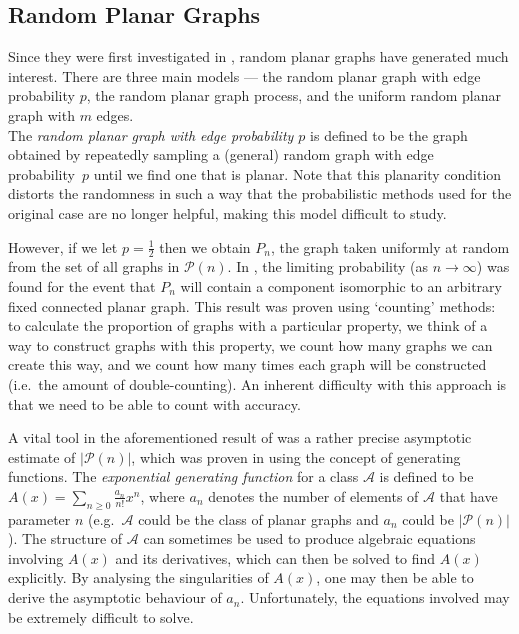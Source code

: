 \documentclass{article}
\newtheorem{Proof of Theorem}{Proof of Theorem}
\begin{document}
\subsection*{Random Planar Graphs}

Since they were first investigated in \cite{den},
random planar graphs have generated much interest.
There are three main models --- 
the random planar graph with edge probability $p$,
the random planar graph process,
and the uniform random planar graph with $m$ edges. \\

The \textit{random planar graph with edge probability $p$} is defined to be the graph obtained by 
repeatedly sampling a (general) random graph with edge probability~$p$ until we find one that is planar.
Note that this planarity condition distorts the randomness in such a way that the probabilistic methods 
used for the original case are no longer helpful,
making this model difficult to study.

However, if we let $p=\frac{1}{2}$ then we obtain $P_{n}$,
the graph taken uniformly at random from the set of all graphs in $\mathcal{P}(n)$.
In \cite{mcd}, the limiting probability (as $n \to \infty$) was found for the event that
$P_{n}$ will contain a component isomorphic to an arbitrary fixed connected planar graph.
This result was proven using `counting' methods:
to calculate the proportion of graphs with a particular property,
we think of a way to construct graphs with this property,
we count how many graphs we can create this way,
and we count how many times each graph will be constructed (i.e.~the amount of double-counting).
An inherent difficulty with this approach is that we need to be able to count with accuracy.

A vital tool in the aforementioned result of \cite{mcd} was a rather precise asymptotic estimate of $|\mathcal{P}(n)|$,
which was proven in \cite{gim} using the concept of generating functions.
The \textit{exponential generating function} for a class $\mathcal{A}$
is defined to be $A(x) = \sum_{n \geq 0} \frac{a_{n}}{n!} x^{n}$,
where $a_{n}$ denotes the number of elements of $\mathcal{A}$ that have parameter $n$
(e.g.~$\mathcal{A}$ could be the class of planar graphs and $a_{n}$ could be $|\mathcal{P}(n)|$).
The structure of $\mathcal{A}$ can sometimes be used to produce algebraic equations involving $A(x)$
and its derivatives,
which can then be solved to find $A(x)$ explicitly.
By analysing the singularities of $A(x)$,
one may then be able to derive the asymptotic behaviour of $a_{n}$.
Unfortunately, the equations involved may be extremely difficult to solve. \\
\end{document}

